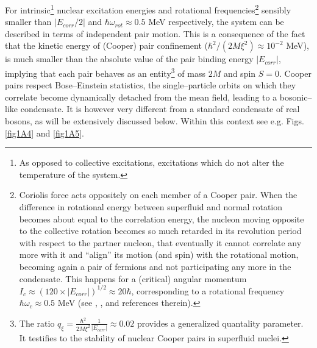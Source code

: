 For intrinsic\footnote{As opposed to collective excitations, excitations which do not alter the temperature of the system.} nuclear excitation energies and rotational frequencies\footnote{Coriolis force acts oppositely on each member of a Cooper pair. When the difference in rotational energy between superfluid and normal rotation becomes about equal to the correlation energy, the nucleon moving opposite to the collective rotation becomes so much retarded in its revolution period with respect to the partner nucleon, that eventually it cannot correlate any more with it and ``align'' its motion (and spin) with the rotational motion, becoming again a pair of fermions and not participating any more in the condensate. This happens for a (critical) angular momentum $I_c\approx(120\times|E_{corr}|)^{1/2}\approx 20\hbar$, corresponding to a rotational frequency $\hbar\omega_c\approx 0.5$ MeV (see \cite{Bohr:75}, \cite{Brink:05}, \cite{Broglia:13} and references therein).} sensibly smaller than $|E_{corr}/2|$ and $\hbar\omega_{rot}\approx0.5$ MeV respectively, the system can be described in terms of independent pair motion. This is a consequence of the fact that the kinetic energy of (Cooper) pair confinement ($\hbar^2/(2M\xi^2)\approx 10^{-2}$ MeV), is much smaller than the absolute value of the pair binding energy $|E_{corr}|$, implying that each pair behaves as an entity\footnote{The ratio $q_\xi=\frac{\hbar^2}{2M\xi^2}\frac{1}{|E_{corr}|}\approx 0.02$ provides a generalized quantality parameter. It testifies to the stability of nuclear Cooper pairs in superfluid nuclei.} of mass $2M$ and spin $S=0$. Cooper pairs respect Bose--Einstein statistics, the single--particle orbits on which they correlate become dynamically detached from the mean field, leading to a bosonic--like condensate. It is however very different from a standard condensate of real bosons, as will be extensively discussed below. Within this context see e.g. Figs. \ref{fig1A4} and \ref{fig1A5}.

